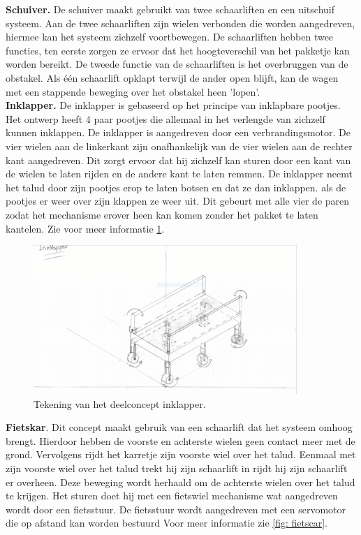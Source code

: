 {\bf Schuiver.}
De schuiver maakt gebruikt van twee schaarliften en een uitschuif systeem. Aan de twee schaarliften zijn wielen verbonden die worden aangedreven, hiermee kan het systeem zichzelf voortbewegen. De schaarliften hebben twee functies, ten eerste zorgen ze ervoor dat het hoogteverschil van het pakketje kan worden bereikt. De tweede functie van de schaarliften is het overbruggen van de obstakel. Als één schaarlift opklapt terwijl de ander open blijft, kan de wagen met een stappende beweging over het obstakel heen 'lopen'. \\

\vspace{\baselineskip}
{\bf Inklapper.}
De inklapper is gebaseerd op het principe van inklapbare pootjes. Het ontwerp heeft 4 paar pootjes die allemaal in het verlengde van zichzelf kunnen inklappen. De inklapper is aangedreven door een verbrandingsmotor. De vier wielen aan de linkerkant zijn onafhankelijk van de vier wielen aan de rechter kant aangedreven. Dit zorgt ervoor dat hij zichzelf kan sturen door een kant van de wielen te laten rijden en de andere kant te laten remmen. De inklapper neemt het talud door zijn pootjes erop te laten botsen en dat ze dan inklappen. als de pootjes er weer over zijn klappen ze weer uit. Dit gebeurt met alle vier de paren zodat het mechanisme erover heen kan komen zonder het pakket te laten kantelen. Zie voor meer informatie \cref{fig:inklapper_tekening}. \\

\begin{figure}[H]
    \centering
    \includegraphics[width = 100mm]{04_idee_ontwikkeling/Inklapper,_deelontwerp_Beer.PNG}
    \caption{Tekening van het deelconcept inklapper.}
    \label{fig:inklapper_tekening}
\end{figure}

\vspace{\baselineskip}
{\bf Fietskar}. Dit concept maakt gebruik van een schaarlift dat het systeem omhoog brengt. Hierdoor hebben de voorste en achterste wielen geen contact meer met de grond. Vervolgens rijdt het karretje zijn voorste wiel over het talud. Eenmaal met zijn voorste wiel over het talud trekt hij zijn schaarlift in rijdt hij zijn schaarlift er overheen. Deze beweging wordt herhaald om de achterste wielen over het talud te krijgen. Het sturen doet hij met een fietswiel mechanisme wat aangedreven wordt door een fietsstuur. De fietsstuur wordt aangedreven met een servomotor die op afstand kan worden bestuurd Voor meer informatie zie \cref{fig: fietscar}.

